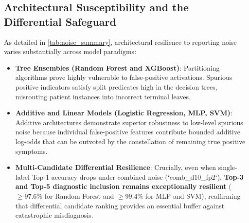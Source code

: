 \subsection{Architectural Susceptibility and the Differential Safeguard}
\label{subsec:noise_architectures}

As detailed in \cref{tab:noise_summary}, architectural resilience to reporting noise varies substantially across model paradigms:
\begin{itemize}
    \item \textbf{Tree Ensembles (Random Forest and XGBoost)}: Partitioning algorithms prove highly vulnerable to false-positive activations. Spurious positive indicators satisfy split predicates high in the decision trees, misrouting patient instances into incorrect terminal leaves.
    \item \textbf{Additive and Linear Models (Logistic Regression, MLP, SVM)}: Additive architectures demonstrate superior robustness to low-level spurious noise because individual false-positive features contribute bounded additive log-odds that can be outvoted by the constellation of remaining true positive symptoms.
    \item \textbf{Multi-Candidate Differential Resilience}: Crucially, even when single-label Top-1 accuracy drops under combined noise (`comb\_d10\_fp2`), \textbf{Top-3 and Top-5 diagnostic inclusion remains exceptionally resilient} ($\ge 97.6\%$ for Random Forest and $\ge 99.4\%$ for MLP and SVM), reaffirming that differential candidate ranking provides an essential buffer against catastrophic misdiagnosis.
\end{itemize}

